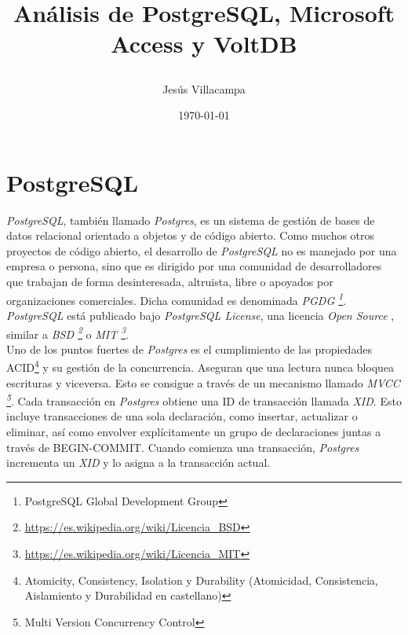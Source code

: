 \documentclass[11pt,a4paper]{article}
\begin{document}
\begin{titlepage}
\title{
\begin{Huge}
\textbf{Análisis de PostgreSQL, Microsoft Access y VoltDB}
\end{Huge}
}
\author{Jesús Villacampa}
\date{\today}


\clearpage\maketitle
\thispagestyle{empty}
\tableofcontents


\end{titlepage}

\newpage

\section{PostgreSQL}
\emph{PostgreSQL}, también llamado \emph{Postgres}, es un sistema de gestión de bases de datos relacional orientado a objetos y de código abierto. Como muchos otros proyectos de código abierto, el desarrollo de \emph{PostgreSQL}  no es manejado por una empresa o persona, sino que es dirigido por una comunidad de desarrolladores que trabajan de forma desinteresada, altruista, libre o apoyados por organizaciones comerciales. Dicha comunidad es denominada \emph{PGDG \footnote{PostgreSQL Global Development Group}}. \cite{POST:2}\\

\emph{PostgreSQL} está publicado bajo \emph{PostgreSQL License}, una licencia \emph{Open Source} , similar a \emph{BSD \footnote{\url{https://es.wikipedia.org/wiki/Licencia_BSD}}} o \emph{MIT \footnote{\url{https://es.wikipedia.org/wiki/Licencia_MIT}}}.\cite{POST:1}\\


Uno de los puntos fuertes de \emph{Postgres} es el cumplimiento de las propiedades ACID\footnote{Atomicity, Consistency, Isolation y Durability (Atomicidad, Consistencia, Aislamiento y Durabilidad en castellano)} y su gestión de la concurrencia. Aseguran que una lectura nunca bloquea escrituras y viceversa. Esto se consigue a través de un mecanismo llamado \emph{MVCC \footnote{Multi Version Concurrency Control}}. Cada transacción en \emph{Postgres} obtiene una ID de transacción llamada \emph{XID}. Esto incluye transacciones de una sola declaración, como insertar, actualizar o eliminar, así como envolver explícitamente un grupo de declaraciones juntas a través de BEGIN-COMMIT. Cuando comienza una transacción, \emph{Postgres} incrementa un \emph{XID} y lo asigna a la transacción actual.\cite{DEV:1}\\
\end{document}
